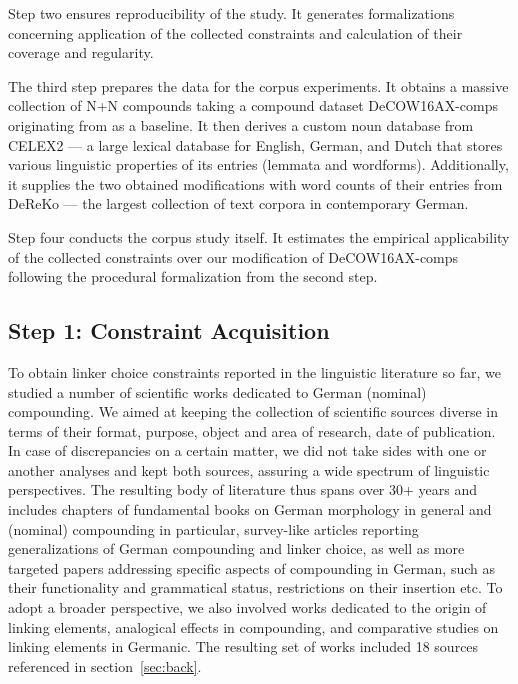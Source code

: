 \documentclass[10pt, a4paper]{article}
\begin{document}
Step two ensures reproducibility of the study. It generates formalizations concerning application of the collected constraints and calculation of their coverage and regularity.     

The third step prepares the data for the corpus experiments. It obtains a massive collection of N+N compounds taking a compound dataset DeCOW16AX-comps originating from  as a baseline. It then derives a custom noun database from CELEX2  --- a large lexical database for English, German, and Dutch that stores various linguistic properties of its entries (lemmata and wordforms). Additionally, it supplies the two obtained modifications with word counts of their entries from DeReKo  --- the largest collection of text corpora in contemporary German.

Step four conducts the corpus study itself. It estimates the empirical applicability of the collected constraints over our modification of DeCOW16AX-comps following the procedural formalization from the second step.




\subsection{Step 1: Constraint Acquisition}
\label{sec:constrget}

To obtain linker choice constraints reported in the linguistic literature so far, we studied a number of scientific works dedicated to German (nominal) compounding. We aimed at keeping the collection of scientific sources diverse in terms of their format, purpose, object and area of research, date of publication. In case of discrepancies on a certain matter, we did not take sides with one or another analyses and kept both sources, assuring a wide spectrum of linguistic perspectives. The resulting body of literature thus spans over 30+ years and includes chapters of fundamental books on German morphology in general and (nominal) compounding in particular, survey-like articles reporting generalizations of German compounding and linker choice, as well as more targeted papers addressing specific aspects of compounding in German, such as their functionality and grammatical status, restrictions on their insertion etc. To adopt a broader perspective, we also involved works dedicated to the origin of linking elements, analogical effects in compounding, and comparative studies on linking elements in Germanic. The resulting set of works included 18 sources referenced in section~\ref{sec:back}.
\end{document}
